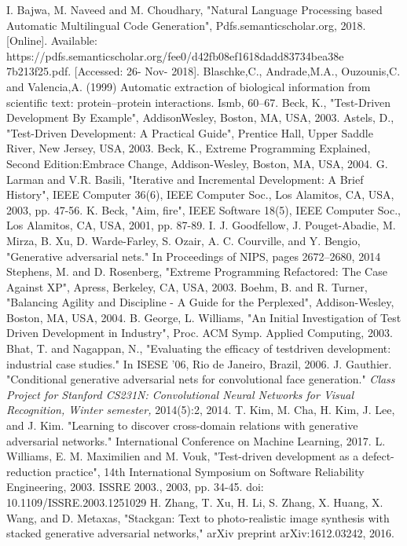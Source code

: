 \documentclass[conference, onecolumn, a4, 12pt]{IEEEtran}
\begin{document}
\begin{thebibliography}{00}
 I. Bajwa, M. Naveed and M. Choudhary, "Natural Language Processing based Automatic Multilingual Code Generation", Pdfs.semanticscholar.org, 2018. [Online]. Available: https://pdfs.semanticscholar.org/fee0/d42fb08ef1618dadd83734bea38e
7b213f25.pdf. [Accessed: 26- Nov- 2018].
 Blaschke,C., Andrade,M.A., Ouzounis,C. and Valencia,A. (1999) Automatic extraction of biological information from scientific text: protein–protein interactions. Ismb, 60–67. 
Beck, K., "Test-Driven Development By Example", AddisonWesley,
Boston, MA, USA, 2003.
Astels, D., "Test-Driven Development: A Practical Guide",
Prentice Hall, Upper Saddle River, New Jersey, USA, 2003.
Beck, K., Extreme Programming Explained, Second Edition:Embrace Change, Addison-Wesley, Boston, MA, USA, 2004.
G. Larman and V.R. Basili, "Iterative and Incremental Development: A Brief History", IEEE Computer 36(6), IEEE Computer Soc., Los Alamitos, CA, USA, 2003, pp. 47-56.
 K. Beck, "Aim, fire", IEEE Software 18(5), IEEE Computer
Soc., Los Alamitos, CA, USA, 2001, pp. 87-89.
 I. J. Goodfellow, J. Pouget-Abadie, M. Mirza, B. Xu, D. Warde-Farley, S. Ozair, A. C. Courville, and Y. Bengio, "Generative adversarial
nets." In Proceedings of NIPS, pages 2672–2680, 2014
Stephens, M. and D. Rosenberg, "Extreme Programming
Refactored: The Case Against XP", Apress, Berkeley, CA, USA,
2003.
Boehm, B. and R. Turner, "Balancing Agility and Discipline
- A Guide for the Perplexed", Addison-Wesley, Boston, MA,
USA, 2004.
B. George, L. Williams, "An Initial Investigation of Test Driven Development in Industry", Proc. ACM Symp. Applied Computing, 2003.
Bhat, T. and Nagappan, N., "Evaluating the efficacy of testdriven
development: industrial case studies." In ISESE '06, Rio
de Janeiro, Brazil, 2006.
 J. Gauthier. "Conditional generative adversarial nets for
convolutional face generation." \textit{Class Project for Stanford
CS231N: Convolutional Neural Networks for Visual Recognition,
Winter semester,} 2014(5):2, 2014.
T. Kim, M. Cha, H. Kim, J. Lee, and J. Kim. "Learning to discover cross-domain relations with generative
adversarial networks." International Conference on Machine Learning, 2017.
 L. Williams, E. M. Maximilien and M. Vouk, "Test-driven development as a defect-reduction practice", 14th International Symposium on Software Reliability Engineering, 2003. ISSRE 2003., 2003, pp. 34-45.
doi: 10.1109/ISSRE.2003.1251029
 H. Zhang, T. Xu, H. Li, S. Zhang, X. Huang, X. Wang, and D. Metaxas,
"Stackgan: Text to photo-realistic image synthesis with stacked generative
adversarial networks," arXiv preprint arXiv:1612.03242, 2016.
\end{thebibliography}

\pagebreak

\begin{appendix}
	\listoffigures
\end{appendix}

\vspace{12pt}
\end{document}
